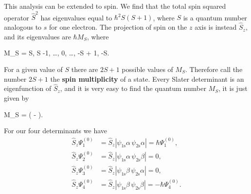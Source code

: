 \documentclass[../Main/chem331-notes.tex]{subfiles}
\begin{document}
This analysis can be extended to spin. We find that the total spin squared operator $\hat{S}^2$ has eigenvalues equal to $\hbar^2 S(S+ 1)$, where $S$ is a quantum number analogous to $s$ for one electron. The projection of spin on the $z$ axis is instead $\hat{S}_z$, and its eigenvalues are $\hbar M_S$, where
\begin{iequation}
M_S = S, S -1, \ldots, 0, \ldots, -S + 1, -S.
\end{iequation}
For a given value of $S$ there are $2S +1$ possible values of $M_S$. Therefore call the number $2S +1$ the \textbf{spin multiplicity} of a state.
Every Slater determinant is an eigenfunction of $\hat{S}_z$, and it is very easy to find the quantum number $M_S$, it is just given by
\begin{iequation}
M_S =  ( - ).
\end{iequation}


For our four determinants we have
\begin{align}
\hat{S}_z \Psi^{(0)}_1 & = \hat{S}_z |\psi_\mathrm{1s} \alpha \, \psi_\mathrm{2s}  \alpha| = \hbar \Psi^{(0)}_1, \\
\hat{S}_z \Psi^{(0)}_2 & = \hat{S}_z  |\psi_\mathrm{1s} \alpha \, \psi_\mathrm{2s}  \beta| = 0, \\
\hat{S}_z \Psi^{(0)}_3 & = \hat{S}_z  |\psi_\mathrm{1s} \beta \, \psi_\mathrm{2s}  \alpha| = 0, \\
\hat{S}_z \Psi^{(0)}_4 & = \hat{S}_z  |\psi_\mathrm{1s} \beta \, \psi_\mathrm{2s}  \beta| = -\hbar \Psi^{(0)}_4.
\end{align}



\end{document}
